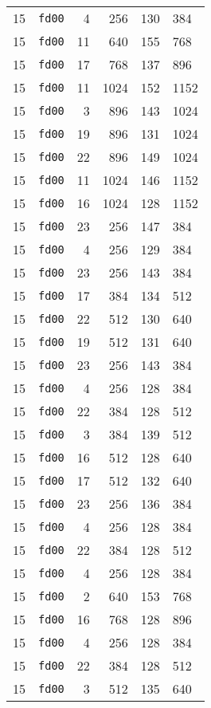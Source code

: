\documentclass{article}
\begin{document}
\begin{table}[h!]
\begin{tabular}{llrrrl}
    15 & \texttt{fd00} & 4 & 256 & 130 & 384 \\
    15 & \texttt{fd00} & 11 & 640 & 155 & 768 \\
    15 & \texttt{fd00} & 17 & 768 & 137 & 896 \\
    15 & \texttt{fd00} & 11 & 1024 & 152 & 1152 \\
    15 & \texttt{fd00} & 3 & 896 & 143 & 1024 \\
    15 & \texttt{fd00} & 19 & 896 & 131 & 1024 \\
    15 & \texttt{fd00} & 22 & 896 & 149 & 1024 \\
    15 & \texttt{fd00} & 11 & 1024 & 146 & 1152 \\
    15 & \texttt{fd00} & 16 & 1024 & 128 & 1152 \\
    15 & \texttt{fd00} & 23 & 256 & 147 & 384 \\
    15 & \texttt{fd00} & 4 & 256 & 129 & 384 \\
    15 & \texttt{fd00} & 23 & 256 & 143 & 384 \\
    15 & \texttt{fd00} & 17 & 384 & 134 & 512 \\
    15 & \texttt{fd00} & 22 & 512 & 130 & 640 \\
    15 & \texttt{fd00} & 19 & 512 & 131 & 640 \\
    15 & \texttt{fd00} & 23 & 256 & 143 & 384 \\
    15 & \texttt{fd00} & 4 & 256 & 128 & 384 \\
    15 & \texttt{fd00} & 22 & 384 & 128 & 512 \\
    15 & \texttt{fd00} & 3 & 384 & 139 & 512 \\
    15 & \texttt{fd00} & 16 & 512 & 128 & 640 \\
    15 & \texttt{fd00} & 17 & 512 & 132 & 640 \\
    15 & \texttt{fd00} & 23 & 256 & 136 & 384 \\
    15 & \texttt{fd00} & 4 & 256 & 128 & 384 \\
    15 & \texttt{fd00} & 22 & 384 & 128 & 512 \\
    15 & \texttt{fd00} & 4 & 256 & 128 & 384 \\
    15 & \texttt{fd00} & 2 & 640 & 153 & 768 \\
    15 & \texttt{fd00} & 16 & 768 & 128 & 896 \\
    15 & \texttt{fd00} & 4 & 256 & 128 & 384 \\
    15 & \texttt{fd00} & 22 & 384 & 128 & 512 \\
    15 & \texttt{fd00} & 3 & 512 & 135 & 640 \\

\end{tabular}
\end{table}
\end{document}
